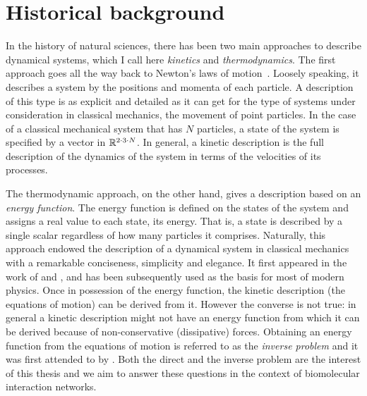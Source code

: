 % 
\section{Historical background}

In the history of natural sciences,
there has been two main approaches to describe dynamical systems,
which I call here
\emph{kinetics} and \emph{thermodynamics}.
The first approach goes all the way back to
Newton's laws of motion~\citep{newton}.
Loosely speaking, it describes a system by
the positions and momenta of each particle.
A description of this type is as explicit and detailed as it can get
for the type of systems under consideration in classical mechanics,
\ie the movement of point particles.
In the case of a classical mechanical system that has $N$ particles,
a state of the system is specified by
a vector in $\mathbb{R}^{2 \cdot 3 \cdot N}$.
In general, a kinetic description is the full description of the
dynamics of the system in terms of the velocities of its processes.

The thermodynamic approach, on the other hand,
gives a description based on an \emph{energy function}.
The energy function is defined on the states of the system
and assigns a real value to each state, its energy.
That is, a state is described by a single scalar
regardless of how many particles it comprises.
Naturally, this approach endowed the description of
a dynamical system in classical mechanics
with a remarkable conciseness, simplicity and elegance.
It first appeared in the work of
\citet{lagrange2} and \citet{hamilton},
and has been subsequently used as the basis for most of modern physics.
Once in possession of the energy function,
the kinetic description (\ie the equations of motion)
can be derived from it.
However the converse is not true:
in general a kinetic description might not have an energy function
from which it can be derived \citep{santilli}
because of non-conservative (dissipative) forces.
Obtaining an energy function from the equations of motion
is referred to as the \emph{inverse problem} %
and it was first attended to by \citet{helmholtz}.
Both the direct and the inverse problem are the interest of this thesis
and we aim to answer these questions
in the context of biomolecular interaction networks.

